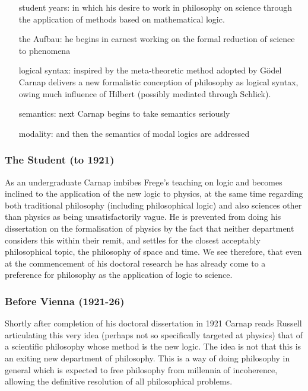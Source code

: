 \documentclass[10pt,titlepage]{book}
\def\ouml{\"o}
\begin{document}
\begin{itemize}
\item[student years:] in which his desire to work in philosophy on science through the application of methods based on mathematical logic.
\item[the Aufbau:] he begins in earnest working on the formal reduction of science to phenomena
\item[logical syntax:] inspired by the meta-theoretic method adopted by G{\ouml}del Carnap delivers a new formalistic conception of philosophy as logical syntax, owing much influence of Hilbert (possibly mediated through Schlick).
\item[semantics:] next Carnap begins to take semantics seriously
\item[modality:] and then the semantics of modal logics are addressed
\end{itemize}

\subsubsection{The Student (to 1921)}

As an undergraduate Carnap imbibes Frege's teaching on logic and becomes inclined to the application of the new logic to physics, at the same  time regarding both traditional philosophy (including philosophical logic) and also sciences other than physics as being unsatisfactorily vague.
He is prevented from doing his dissertation on the formalisation of physics by the fact that neither department considers this within their remit, and settles for the closest acceptably philosophical topic, the philosophy of space and time.
We see therefore, that even at the commencement of his doctoral research he has already come to a preference for philosophy as the application of logic to science.

\subsubsection{Before Vienna (1921-26)}

Shortly after completion of his doctoral dissertation in 1921 Carnap reads Russell articulating this very idea (perhaps not so specifically targeted at physics) that of a scientific philosophy whose method is the new logic.
The idea is not that this is an exiting new department of philosophy.
This is a way of doing philosophy in general which is expected to free philosophy from millennia of incoherence, allowing the definitive resolution of all philosophical problems.
\end{document}

